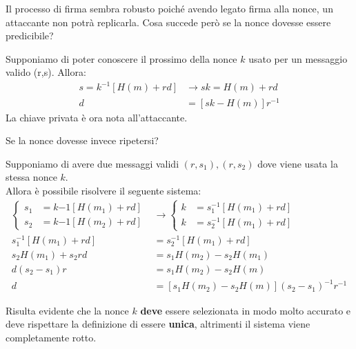 Il processo di firma sembra robusto poiché avendo legato firma alla nonce, un attaccante non potrà replicarla. Cosa succede però se la nonce dovesse essere predicibile?\pagebreak
\begin{corollary}\label{cor:kpred}
Supponiamo di poter conoscere il prossimo della nonce $k$ usato per un messaggio valido (r,s)\footnotemark. Allora:
\begin{align*}
    s=k^{-1}[H(m)+rd]&\longrightarrow sk=H(m)+rd\\
    d&=[sk-H(m)]r^{-1}
\end{align*}
La chiave privata è ora nota all'attaccante.
\end{corollary}
Se la nonce dovesse invece ripetersi?
\begin{corollary}\label{cor:krep}
Supponiamo di avere due messaggi validi $(r,s_1),(r,s_2)$ dove viene usata la stessa nonce $k$.\footnotemark\\
Allora è possibile risolvere il seguente sistema:
\begin{equation*}
\begin{aligned}
    \begin{cases}
    s_1&=k{-1}[H(m_1)+rd]\\
    s_2&=k{-1}[H(m_2)+rd]
    \end{cases}
    &\longrightarrow
    \begin{cases}
    k&=s_1^{-1}[H(m_1)+rd]\\
    k&=s_2^{-1}[H(m_1)+rd]
    \end{cases}\\
    s_1^{-1}[H(m_1)+rd]&=s_2^{-1}[H(m_1)+rd]\\
    s_2H(m_1)+s_2rd&=s_1H(m_2)-s_2H(m_1)\\
d(s_2-s_1)r&=s_1H(m_2)-s_2H(m)\\
d&=[s_1H(m_2)-s_2H(m)](s_2-s_1)^{-1}r^{-1}
    \end{aligned}
\end{equation*}
\end{corollary}
\begin{remark}
Risulta evidente che la nonce $k$ \textbf{deve} essere selezionata in modo molto accurato e deve rispettare la definizione di essere \textbf{unica}, altrimenti il sistema viene completamente rotto.
\end{remark}\pagebreak
